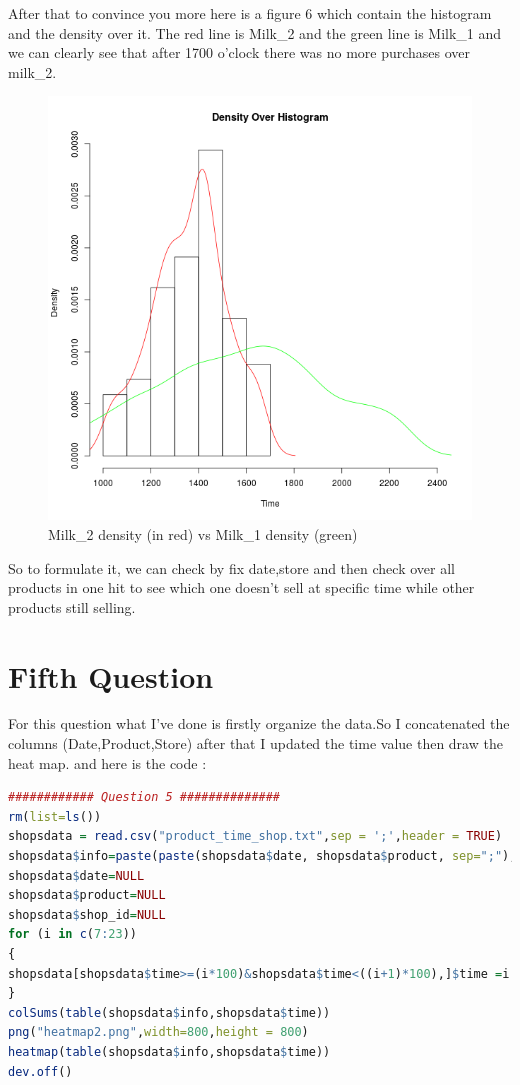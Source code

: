 \documentclass{article}
\begin{document}
\begin{flushleft}

After that to convince you more here is a figure 6 which contain the histogram and the density over it. The red line is Milk\_2 and the green line is Milk\_1 and we can clearly see that after 1700 o'clock there was no more purchases over milk\_2.
\begin{figure}[H]
\begin{center}
\includegraphics[scale=0.8]{histdensity.png}
\end{center}
\caption{Milk\_2 density (in red) vs Milk\_1 density (green)}
\end{figure}
So to formulate it, we can check by fix date,store and then check over all products in one hit to see which one doesn't sell at specific time while other products still selling.
\end{flushleft}
		{\centering \section*{Fifth Question}}
For this question what I've done is firstly organize the data.So I concatenated the columns (Date,Product,Store) after that I updated the time value then draw the heat map.
and here is the code : 
\begin{lstlisting}[language=R]
############ Question 5 ##############
rm(list=ls())
shopsdata = read.csv("product_time_shop.txt",sep = ';',header = TRUE)
shopsdata$info=paste(paste(shopsdata$date, shopsdata$product, sep=";"),shopsdata$shop_id,sep = ";")
shopsdata$date=NULL
shopsdata$product=NULL
shopsdata$shop_id=NULL
for (i in c(7:23))
{
shopsdata[shopsdata$time>=(i*100)&shopsdata$time<((i+1)*100),]$time =i
}
colSums(table(shopsdata$info,shopsdata$time))
png("heatmap2.png",width=800,height = 800)
heatmap(table(shopsdata$info,shopsdata$time))
dev.off()
\end{lstlisting}
\end{document}
